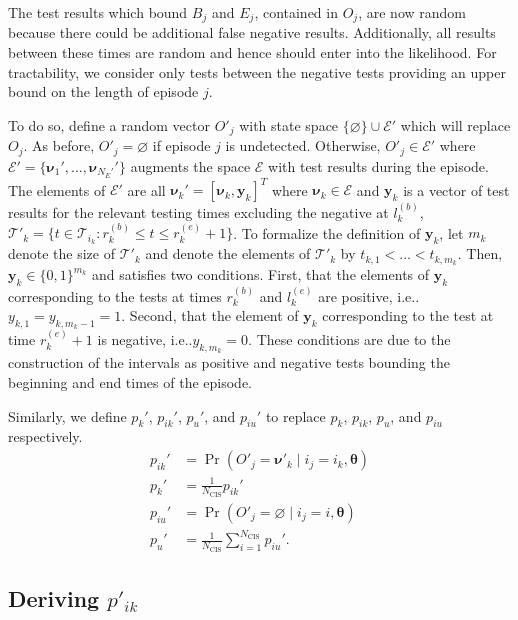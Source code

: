 \documentclass[referee,useAMS,usenatbib]{biom}
\makeatletter
\DeclareMathOperator{\prob}{\mathrm{Pr}}
\newcommand\set{\mathcal}
\renewcommand{\vec}[1]{\bm{#1}}
\newcommand{\ssep}{:}
\newcommand{\Ncis}{N_\text{CIS}}
\newcommand{\sched}{\mathcal{T}}
\DeclareRobustCommand\onedot{\futurelet\@let@token\@onedot}
\def\@onedot{\ifx\@let@token.\else.\null\fi\xspace}
\def\ie{i.e\onedot} \def\Ie{{I.e}\onedot}
\makeatother
\begin{document}
The test results which bound $B_j$ and $E_j$, contained in $O_j$, are now random because there could be additional false negative results.
Additionally, all results between these times are random and hence should enter into the likelihood.
For tractability, we consider only tests between the negative tests providing an upper bound on the length of episode $j$.

To do so, define a random vector $O'_j$ with state space $\{\varnothing\} \cup \set{E}'$ which will replace $O_j$.
As before, $O'_j = \varnothing$ if episode $j$ is undetected.
Otherwise, $O'_j \in \set{E}'$ where $\set{E}' = \{ \vec{\nu}_1', \dots, \vec{\nu}_{N_E'}' \}$ augments the space $\set{E}$ with test results during the episode.
The elements of $\set{E}'$ are all $\vec{\nu}_k' = [\vec{\nu}_k, \vec{y}_k]^T$ where $\vec{\nu}_k \in \set{E}$ and $\vec{y}_k$ is a vector of test results for the relevant testing times excluding the negative at $l^{(b)}_k$, $\sched'_k = \{ t \in \sched_{i_k} \ssep r_k^{(b)} \leq t \leq r_k^{(e)} + 1 \}$.
To formalize the definition of $\vec{y}_k$, let $m_k$ denote the size of $\sched'_k$ and denote the elements of $\sched'_k$ by $t_{k,1} < \dots < t_{k,m_k}$.
Then, $\vec{y}_k \in \{0, 1\}^{m_k}$ and satisfies two conditions.
First, that the elements of $\vec{y}_k$ corresponding to the tests at times $r_k^{(b)}$ and $l_k^{(e)}$ are positive, \ie $y_{k,1} = y_{k,m_k-1} = 1$.
Second, that the element of $\vec{y}_k$ corresponding to the test at time $r_k^{(e)} + 1$ is negative, \ie $y_{k,m_k} = 0$.
These conditions are due to the construction of the intervals as positive and negative tests bounding the beginning and end times of the episode.

Similarly, we define $p_k'$, $p_{ik}'$, $p_u'$, and $p_{iu}'$ to replace $p_k$, $p_{ik}$, $p_u$, and $p_{iu}$ respectively.
\begin{align}
    p_{ik}' &= \prob(O'_j = \vec{\nu}'_k \mid i_j = i_k, \vec{\theta}) \\
    p_k' &= \frac{1}{\Ncis} p_{ik}' \\
    p_{iu}' &= \prob(O'_j = \varnothing \mid i_j = i, \vec{\theta}) \\
    p_u' &= \frac{1}{\Ncis} \sum_{i=1}^{\Ncis} p_{iu}'.
\end{align}

\subsection{Deriving $p'_{ik}$} \label{imperf-test:sec:modifying-p_ia}
\end{document}
